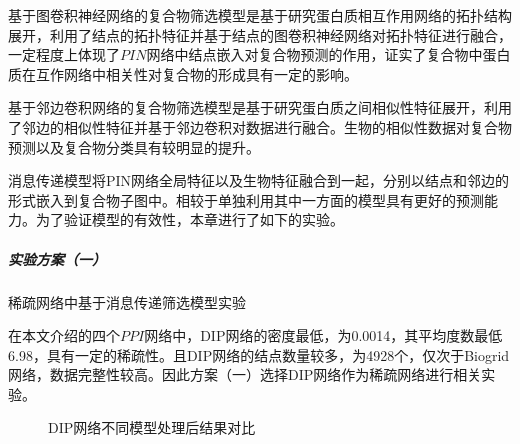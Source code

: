 基于图卷积神经网络的复合物筛选模型是基于研究蛋白质相互作用网络的拓扑结构展开，利用了结点的拓扑特征并基于结点的图卷积神经网络对拓扑特征进行融合，一定程度上体现了$PIN$网络中结点嵌入对复合物预测的作用，证实了复合物中蛋白质在互作网络中相关性对复合物的形成具有一定的影响。

基于邻边卷积网络的复合物筛选模型是基于研究蛋白质之间相似性特征展开，利用了邻边的相似性特征并基于邻边卷积对数据进行融合。生物的相似性数据对复合物预测以及复合物分类具有较明显的提升。

消息传递模型将PIN网络全局特征以及生物特征融合到一起，分别以结点和邻边的形式嵌入到复合物子图中。相较于单独利用其中一方面的模型具有更好的预测能力。为了验证模型的有效性，本章进行了如下的实验。


\subparagraph*{实验方案（一）} 稀疏网络中基于消息传递筛选模型实验

在本文介绍的四个$PPI$网络中，DIP网络的密度最低，为0.0014，其平均度数最低6.98，具有一定的稀疏性。且DIP网络的结点数量较多，为4928个，仅次于Biogrid网络，数据完整性较高。因此方案（一）选择DIP网络作为稀疏网络进行相关实验。

\begin{figure}[htbp]
    \centering
    \vskip0.2cm
    \caption{DIP网络不同模型处理后结果对比}
    \label{fig:dip_fusion}
\end{figure}


